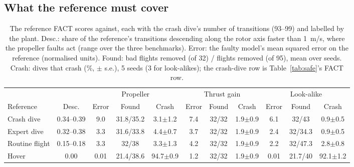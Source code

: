 \documentclass[preprint,12pt]{elsarticle}
\newcommand{\method}{FACT}
\newcommand{\pmse}[2]{#1{\scriptsize$\pm$#2}}
\begin{document}
\subsection{What the reference must cover}\label{sec:ref}

\begin{table}[t]
\caption{The reference \method{} scores against, each with the crash dive's number of transitions (93--99) and labelled by the plant. Desc.: share of the reference's transitions descending along the rotor axis faster than 1~m/s, where the propeller faults act (range over the three benchmarks). Error: the faulty model's mean squared error on the reference (normalised units). Found: bad flights removed (of 32) / flights removed (of 95), mean over seeds. Crash: dives that crash (\%, $\pm$ s.e.), 5 seeds (3 for look-alikes); the crash-dive row is Table~\ref{tab:safe}'s \method{} row.}
\label{tab:ref}
\centering\footnotesize
\setlength{\tabcolsep}{2pt}
\begin{tabular}{@{}lcccccccccc@{}}
\toprule
 & & \multicolumn{3}{c}{Propeller} & \multicolumn{3}{c}{Thrust gain} & \multicolumn{3}{c}{Look-alike} \\
Reference & Desc. & Error & Found & Crash & Error & Found & Crash & Error & Found & Crash \\
\midrule
Crash dive & 0.34--0.39 & 9.0 & 31.8/35.2 & \pmse{3.1}{1.2} & 7.4 & 32/32 & \pmse{1.9}{0.9} & 6.1 & 32/43 & \pmse{0.9}{0.5} \\
Expert dive & 0.32--0.38 & 3.3 & 31.6/33.8 & \pmse{4.4}{0.7} & 3.7 & 32/32 & \pmse{1.9}{0.9} & 2.4 & 32/34.3 & \pmse{0.9}{0.5} \\
Routine flight & 0.15--0.18 & 3.3 & 32/38 & \pmse{3.3}{1.3} & 4.2 & 32/32 & \pmse{1.9}{0.9} & 2.2 & 32/47.3 & \pmse{2.8}{0.8} \\
Hover & 0.00 & 0.01 & 21.4/38.6 & \pmse{94.7}{0.9} & 1.2 & 32/32 & \pmse{1.9}{0.9} & 0.01 & 21.7/40 & \pmse{92.1}{1.2} \\
\bottomrule
\end{tabular}
\end{table}
\end{document}
